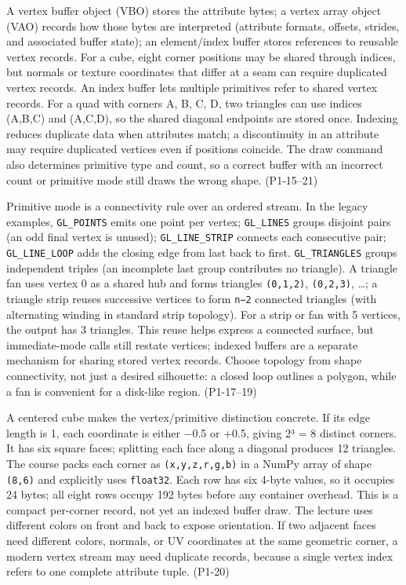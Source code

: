 A vertex buffer object (VBO) stores the attribute bytes; a vertex array object (VAO) records how those bytes are interpreted (attribute formats, offsets, strides, and associated buffer state); an element/index buffer stores references to reusable vertex records. For a cube, eight corner positions may be shared through indices, but normals or texture coordinates that differ at a seam can require duplicated vertex records. An index buffer lets multiple primitives refer to shared vertex records. For a quad with corners A, B, C, D, two triangles can use indices (A,B,C) and (A,C,D), so the shared diagonal endpoints are stored once. Indexing reduces duplicate data when attributes match; a discontinuity in an attribute may require duplicated vertices even if positions coincide. The draw command also determines primitive type and count, so a correct buffer with an incorrect count or primitive mode still draws the wrong shape. (P1-15--21)

Primitive mode is a connectivity rule over an ordered stream. In the legacy examples, \texttt{GL\_POINTS} emits one point per vertex; \texttt{GL\_LINES} groups disjoint pairs (an odd final vertex is unused); \texttt{GL\_LINE\_STRIP} connects each consecutive pair; \texttt{GL\_LINE\_LOOP} adds the closing edge from last back to first. \texttt{GL\_TRIANGLES} groups independent triples (an incomplete last group contributes no triangle). A triangle fan uses vertex 0 as a shared hub and forms triangles \texttt{(0,1,2)}, \texttt{(0,2,3)}, \ldots; a triangle strip reuses successive vertices to form \texttt{n−2} connected triangles (with alternating winding in standard strip topology). For a strip or fan with 5 vertices, the output has 3 triangles. This reuse helps express a connected surface, but immediate-mode calls still restate vertices; indexed buffers are a separate mechanism for sharing stored vertex records. Choose topology from shape connectivity, not just a desired silhouette: a closed loop outlines a polygon, while a fan is convenient for a disk-like region. (P1-17--19)

A centered cube makes the vertex/primitive distinction concrete. If its edge length is 1, each coordinate is either −0.5 or +0.5, giving 2³ = 8 distinct corners. It has six square faces; splitting each face along a diagonal produces 12 triangles. The course packs each corner as \texttt{(x,y,z,r,g,b)} in a NumPy array of shape \texttt{(8,6)} and explicitly uses \texttt{float32}. Each row has six 4-byte values, so it occupies 24 bytes; all eight rows occupy 192 bytes before any container overhead. This is a compact per-corner record, not yet an indexed buffer draw. The lecture uses different colors on front and back to expose orientation. If two adjacent faces need different colors, normals, or UV coordinates at the same geometric corner, a modern vertex stream may need duplicate records, because a single vertex index refers to one complete attribute tuple. (P1-20)

